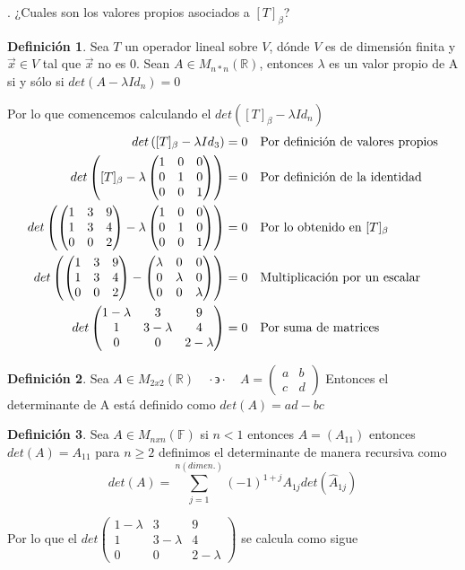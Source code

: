 \documentclass[letterpaper]{article}
\newcommand{\F}{\mathds{F}}
\newcommand{\tq}{ \quad \cdot  \backepsilon \cdot \quad }
\newcommand{\R}{\mathds{R}}
\renewcommand{\*}{\cdot}
\newcommand{\Iden}{\begin{pmatrix}
		1 & 0 & 0\\
		0 & 1 & 0\\
		0 & 0 & 1 
\end{pmatrix}}
\newcommand{\T}{\begin{pmatrix}
		1 & 3 & 9 \\
		1 & 3 & 4 \\
		0 & 0 & 2 
\end{pmatrix} }
\theoremstyle{definition}
\newtheorem{definition}{Definición}
\begin{document}
. ¿Cuales son los valores propios asociados a $[T]_{\beta}$?
\begin{definition}
	Sea $ T $ un operador lineal sobre $V$, dónde $V$ es de dimensión finita y $\vec{x}\in V$ tal que $\vec{x}$ no es 0. 
	Sean $A\in M_{n*n}(\mathbb{R})$, entonces $\lambda$ es un valor propio de A si y sólo si $det(A-\lambda Id_{n})=0$
\end{definition}

Por lo que comencemos calculando el $ det([T]_{\beta} - \lambda Id_n) $
\begin{align*}
	det\left([T]_\beta - \lambda Id_3 \right) &= 0 && \text{Por definición de valores propios}\\
	det\left([T]_\beta - \lambda\Iden \right) &= 0 && \text{Por definición de la identidad}\\
	det\left(\T - \lambda\Iden \right) &= 0 && \text{Por lo obtenido en $ [T]_\beta $}\\
	det\left(\T - \begin{pmatrix}
	\lambda & 0 & 0\\
	0 & \lambda & 0\\
	0 & 0 & \lambda
	\end{pmatrix} \right) &= 0 && \text{Multiplicación por un escalar}\\
	det \begin{pmatrix}
	1- \lambda & 3 & 9\\
	1 & 3 -\lambda & 4\\
	0 & 0 & 2- \lambda 
	\end{pmatrix} &= 0 && \text{Por suma de matrices}\\
\end{align*}

\begin{definition}
	Sea $ A \in M_{2x2}(\R) \tq A = \begin{pmatrix}
	a& b\\
	c& d
	\end{pmatrix}$ Entonces el determinante de A está definido como $  det(A) = ad -bc $
\end{definition}
	\begin{definition}
	Sea $ A \in M_{nxn}(\F) $  si $ n < 1 $ entonces $ A = (A_{11}) $ entonces $ det(A) = A_{11} $ para $ n\geq 2 $ definimos el determinante de manera recursiva como
	\[ det(A) = \sum_{j = 1}^{n (dimen.)} (-1)^{1 + j} A_{1j}det(\hat{A}_{1j}) \]
\end{definition}

Por lo que el  $ 	det \begin{pmatrix}
1- \lambda & 3 & 9\\
1 & 3 -\lambda & 4\\
0 & 0 & 2- \lambda 
\end{pmatrix} $ se calcula como sigue
\end{document}
